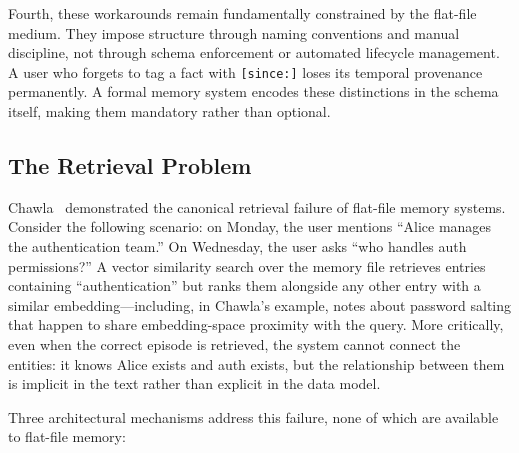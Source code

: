 Fourth, these workarounds remain fundamentally constrained by the
flat-file medium.  They impose structure through naming conventions and
manual discipline, not through schema enforcement or automated
lifecycle management.  A user who forgets to tag a fact with
\texttt{[since:]} loses its temporal provenance permanently.  A formal
memory system encodes these distinctions in the schema itself, making
them mandatory rather than optional.

\subsection{The Retrieval Problem}
\label{sec:memorymd-retrieval}

Chawla~\cite{chawla2026} demonstrated the canonical retrieval failure
of flat-file memory systems.  Consider the following scenario: on Monday,
the user mentions ``Alice manages the authentication team.''  On
Wednesday, the user asks ``who handles auth permissions?''  A vector
similarity search over the memory file retrieves entries containing
``authentication'' but ranks them alongside any other entry with a
similar embedding---including, in Chawla's example, notes about
password salting that happen to share embedding-space proximity with the
query.  More critically, even when the correct episode is retrieved, the
system cannot connect the entities: it knows Alice exists and auth
exists, but the relationship between them is implicit in the text rather
than explicit in the data model.

Three architectural mechanisms address this failure, none of which are
available to flat-file memory:

